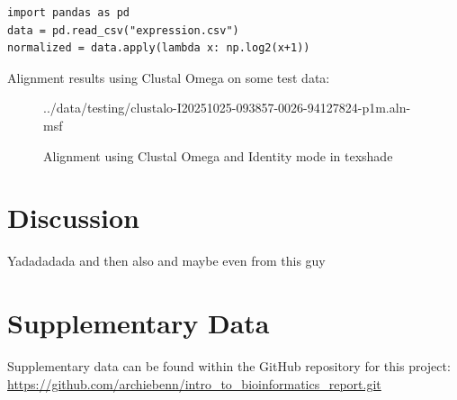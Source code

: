 \documentclass[12pt]{article}
\begin{document}
\begin{verbatim}
import pandas as pd
data = pd.read_csv("expression.csv")
normalized = data.apply(lambda x: np.log2(x+1))
\end{verbatim}

Alignment results using Clustal Omega on some test data: 
\begin{figure}[htbp]
\begin{texshade}{../data/testing/clustalo-I20251025-093857-0026-94127824-p1m.aln-msf}
\showlegend
\end{texshade}
\caption{Alignment using Clustal Omega and Identity mode in texshade}
\label{fig:workflow}
\end{figure}



\section*{Discussion}
Yadadadada \citep{kent2002blat} and then also \citep{wolin1997microbe} and maybe even from this guy \cite{baker1997signaling,wolin1997microbe}








\section*{Supplementary Data}
Supplementary data can be found within the GitHub repository for this project: \url{https://github.com/archiebenn/intro_to_bioinformatics_report.git}
\end{document}
